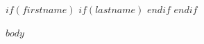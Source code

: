 \documentclass{latex/simplecv}
\begin{document}
$if(firstname)$
$if(lastname)$
\cvheader
$endif$
$endif$

$body$
\end{document}
